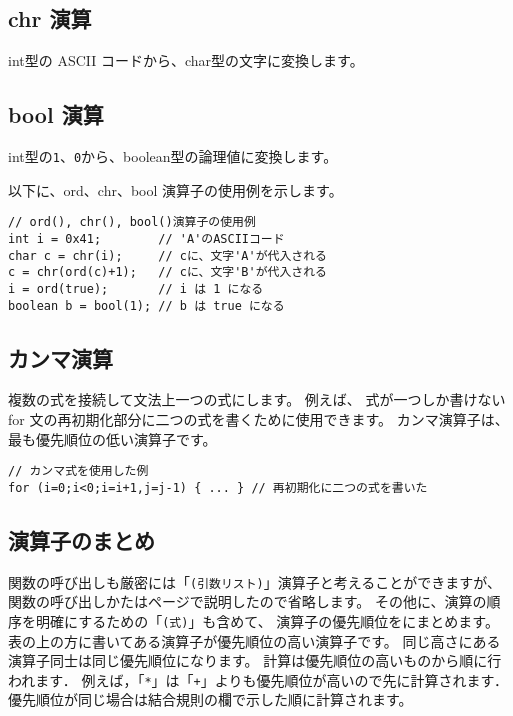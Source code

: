 \subsection{chr 演算}
\label{chap3:chr}

int型の ASCII コードから、char型の文字に変換します。

\subsection{bool 演算}
\label{chap3:bool}

int型の\verb/1/、\verb/0/から、boolean型の論理値に変換します。

以下に、ord、chr、bool 演算子の使用例を示します。

\begin{mylist}
\begin{verbatim}
// ord(), chr(), bool()演算子の使用例
int i = 0x41;        // 'A'のASCIIコード
char c = chr(i);     // cに、文字'A'が代入される
c = chr(ord(c)+1);   // cに、文字'B'が代入される
i = ord(true);       // i は 1 になる
boolean b = bool(1); // b は true になる
\end{verbatim}
\end{mylist}

\subsection{カンマ演算}
複数の式を接続して文法上一つの式にします。
例えば、
式が一つしか書けない for 文の再初期化部分に二つの式を書くために使用できます。
カンマ演算子は、最も優先順位の低い演算子です。

\begin{mylist}
\begin{verbatim}
// カンマ式を使用した例
for (i=0;i<0;i=i+1,j=j-1) { ... } // 再初期化に二つの式を書いた
\end{verbatim}
\end{mylist}

\subsection{演算子のまとめ}

関数の呼び出しも厳密には「\verb/(引数リスト)/」演算子と考えることができますが、
関数の呼び出しかたは\pageref{chap3:func}ページで説明したので省略します。
その他に、演算の順序を明確にするための「\verb/(式)/」も含めて、
演算子の優先順位をにまとめます。
表の上の方に書いてある演算子が優先順位の高い演算子です。
同じ高さにある演算子同士は同じ優先順位になります。
計算は優先順位の高いものから順に行われます．
例えば，「\verb/*/」は「\verb/+/」よりも優先順位が高いので先に計算されます．
優先順位が同じ場合は結合規則の欄で示した順に計算されます。

